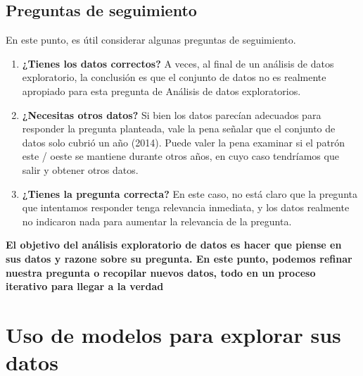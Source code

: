 \documentclass[10pt]{book}
\begin{document}
        \subsection{Preguntas de seguimiento}
        En este punto, es útil considerar algunas preguntas de seguimiento.
        \begin{enumerate}[ \bfseries 1.]
            \item \textbf{¿Tienes los datos correctos?} A veces, al final de un análisis de datos exploratorio, la conclusión es que el conjunto de datos no es realmente apropiado para esta pregunta de Análisis de datos exploratorios.
            \item \textbf{¿Necesitas otros datos?} Si bien los datos parecían adecuados para responder la pregunta planteada, vale la pena señalar que el conjunto de datos solo cubrió un año (2014). Puede valer la pena examinar si el patrón este / oeste se mantiene durante otros años, en cuyo caso tendríamos que salir y obtener otros datos.
            \item \textbf{¿Tienes la pregunta correcta?} En este caso, no está claro que la pregunta que intentamos responder tenga relevancia inmediata, y los datos realmente no indicaron nada para aumentar la relevancia de la pregunta.
        \end{enumerate}
        \textbf{El objetivo del análisis exploratorio de datos es hacer que piense en sus datos y razone sobre su pregunta. En este punto, podemos refinar nuestra pregunta o recopilar nuevos datos, todo en un proceso iterativo para llegar a la verdad}

    \section{Uso de modelos para explorar sus datos}
    
\end{document}
